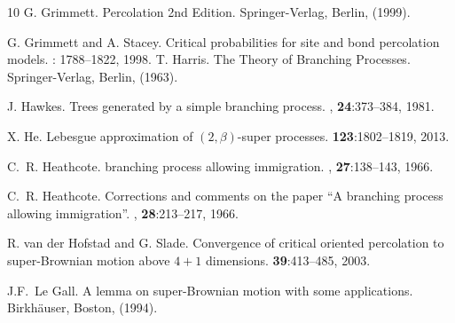 \documentclass[12pt]{article}
\numberwithin{theorem}{section}
\theoremstyle{def}
\numberwithin{equation}{section}
\begin{document}
\begin{thebibliography}{10}
G. Grimmett.
\newblock Percolation 2nd Edition.
\newblock Springer-Verlag, Berlin, (1999).

G. Grimmett and A. Stacey.
\newblock Critical probabilities for site and bond percolation models.
: 1788--1822, 1998.
T. Harris.
\newblock The Theory of Branching Processes.
\newblock Springer-Verlag, Berlin, (1963).

J. Hawkes.
\newblock Trees generated by a simple branching process.
, {\bf 24}:373--384, 1981. 

X. He.
\newblock Lebesgue approximation of $(2,\beta)$-super processes.
 {\bf 123}:1802--1819, 2013.

C.~R. Heathcote.
 branching process
allowing immigration.
, {\bf 27}:138--143, 1966.

C.~R. Heathcote.
\newblock Corrections and comments on the paper ``{A} branching process
allowing immigration''.
, {\bf 28}:213--217, 1966.

R. van der Hofstad and G. Slade.
\newblock Convergence of critical oriented percolation to super-Brownian motion above $4+1$ dimensions.
 {\bf 39}:413--485, 2003.


J.F.~Le Gall.
A lemma on super-Brownian motion with some applications.
\newblock Birkh\"auser, Boston, (1994).



\end{thebibliography}
\end{document}

